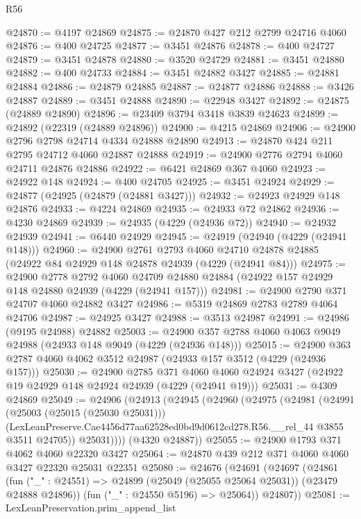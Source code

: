 \begin{lexlean}{R56}
\begin{coremodule}
@24870 := @4197 @24869
@24875 := @24870 @427 @212 @2799 @24716 @4060
@24876 := @400 @24725
@24877 := @3451 @24876
@24878 := @400 @24727
@24879 := @3451 @24878
@24880 := @3520 @24729
@24881 := @3451 @24880
@24882 := @400 @24733
@24884 := @3451 @24882 @3427
@24885 := @24881 @24884
@24886 := @24879 @24885
@24887 := @24877 @24886
@24888 := @3426 @24887
@24889 := @3451 @24888
@24890 := @22948 @3427
@24892 := @24875 (@24889 @24890)
@24896 := @23409 @3794 @3418 @3839 @24623
@24899 := @24892 (@22319 (@24889 @24896))
@24900 := @4215 @24869
@24906 := @24900 @2796 @2798 @24714 @4334 @24888 @24890
@24913 := @24870 @424 @211 @2795 @24712 @4060 @24887 @24888
@24919 := @24900 @2776 @2794 @4060 @24711 @24876 @24886
@24922 := @6421 @24869 @367 @4060
@24923 := @24922 @148
@24924 := @400 @24705
@24925 := @3451 @24924
@24929 := @24877 (@24925 (@24879 (@24881 @3427)))
@24932 := @24923 @24929 @148 @24876
@24933 := @4224 @24869
@24935 := @24933 @72 @24862
@24936 := @4230 @24869
@24939 := @24935 (@4229 (@24936 @72))
@24940 := @24932 @24939
@24941 := @6440 @24929
@24945 := @24919 (@24940 (@4229 (@24941 @148)))
@24960 := @24900
    @2761
    @2793
    @4060
    @24710
    @24878
    @24885
    (@24922 @84 @24929 @148 @24878 @24939 (@4229 (@24941 @84)))
@24975 := @24900
    @2778
    @2792
    @4060
    @24709
    @24880
    @24884
    (@24922 @157 @24929 @148 @24880 @24939 (@4229 (@24941 @157)))
@24981 := @24900 @2790 @371 @24707 @4060 @24882 @3427
@24986 := @5319 @24869 @2783 @2789 @4064 @24706
@24987 := @24925 @3427
@24988 := @3513 @24987
@24991 := @24986 (@9195 @24988) @24882
@25003 := @24900 @357 @2788 @4060 @4063 @9049 @24988 (@24933 @148 @9049 (@4229 (@24936 @148)))
@25015 := @24900 @363 @2787 @4060 @4062 @3512 @24987 (@24933 @157 @3512 (@4229 (@24936 @157)))
@25030 := @24900
    @2785
    @371
    @4060
    @4060
    @24924
    @3427
    (@24922 @19 @24929 @148 @24924 @24939 (@4229 (@24941 @19)))
@25031 := @4309 @24869
@25049 := @24906
    (@24913
      (@24945
        (@24960
          (@24975
            (@24981
              (@24991
                (@25003 (@25015 (@25030 @25031)))
                (LexLeanPreserve.Cae4456d77aa62528ed0bd9d0612cd278.R56.__rel_44 @3855 @3511 @24705))
              @25031))))
      (@4320 @24887))
@25055 := @24900 @1793 @371 @4062 @4060 @22320 @3427
@25064 := @24870 @439 @212 @371 @4060 @4060 @3427 @22320 @25031 @22351
@25080 := @24676
    (@24691
      (@24697
        (@24861
          (fun ("_" : @24551) => @24899 (@25049 (@25055 @25064 @25031)) (@23479 @24888 @24896))
          (fun ("_" : @24550 @5196) => @25064))
        @24807))
@25081 := LexLeanPreservation.prim_append_list

\end{coremodule}
\end{lexlean}
